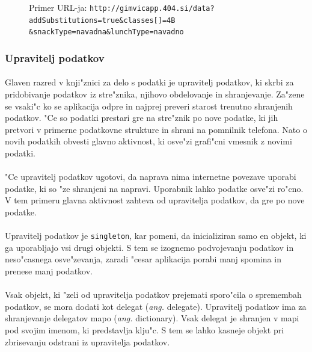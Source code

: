 \begin{figure}[!h]
	\centering
	Primer URL-ja:
	\texttt{http://gimvicapp.404.si/data?addSubstitutions=true\&classes[]=4B\\\&snackType=navadna\&lunchType=navadno}
\end{figure}

\subsubsection{Upravitelj podatkov}
\paragraph{}
Glaven razred v knji"znici za delo s podatki je upravitelj podatkov, ki skrbi za pridobivanje podatkov iz stre"znika, njihovo obdelovanje in shranjevanje. Za"zene se vsaki"c ko se aplikacija odpre in najprej preveri starost trenutno shranjenih podatkov. "Ce so podatki prestari gre na stre"znik po nove podatke, ki jih pretvori v primerne podatkovne strukture in shrani na pomnilnik telefona. Nato o novih podatkih obvesti glavno aktivnost, ki osve"zi grafi"cni vmesnik z novimi podatki.

\paragraph{}
"Ce upravitelj podatkov ugotovi, da naprava nima internetne povezave uporabi podatke, ki so "ze shranjeni na napravi. Uporabnik lahko podatke osve"zi ro"cno. V tem primeru glavna aktivnost zahteva od upravitelja podatkov, da gre po nove podatke.

\paragraph{}
Upravitelj podatkov je \texttt{singleton}, kar pomeni, da inicializiran samo en objekt, ki ga uporabljajo vsi drugi objekti. S tem se izognemo podvojevanju podatkov in neso"casnega osve"zevanja, zaradi "cesar aplikacija porabi manj spomina in prenese manj podatkov.

\paragraph{}
Vsak objekt, ki "zeli od upravitelja podatkov prejemati sporo"cila o spremembah podatkov, se mora dodati kot delegat (\textit{ang.} delegate). Upravitelj podatkov ima za shranjevanje delegatov mapo (\textit{ang.} dictionary). Vsak delegat je shranjen v mapi pod svojim imenom, ki predstavlja klju"c. S tem se lahko kasneje objekt pri zbrisevanju odstrani iz upravitelja podatkov. 

